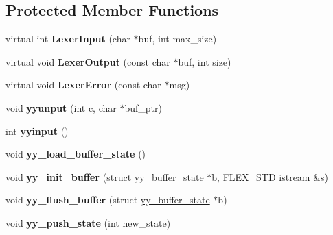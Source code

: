 \subsection*{Protected Member Functions}
\begin{DoxyCompactItemize}
\item 
virtual int {\bfseries Lexer\+Input} (char $\ast$buf, int max\+\_\+size)\hypertarget{classyyFlexLexer_af9c0885f114ce4f3749e6ad2f388d32c}{}\label{classyyFlexLexer_af9c0885f114ce4f3749e6ad2f388d32c}

\item 
virtual void {\bfseries Lexer\+Output} (const char $\ast$buf, int size)\hypertarget{classyyFlexLexer_ae395429e59be89963e517411ec09c6ca}{}\label{classyyFlexLexer_ae395429e59be89963e517411ec09c6ca}

\item 
virtual void {\bfseries Lexer\+Error} (const char $\ast$msg)\hypertarget{classyyFlexLexer_aace65d0bcf43507968bb9212a9dceb59}{}\label{classyyFlexLexer_aace65d0bcf43507968bb9212a9dceb59}

\item 
void {\bfseries yyunput} (int c, char $\ast$buf\+\_\+ptr)\hypertarget{classyyFlexLexer_a54064ce670d0caa1a45c5656d5e11538}{}\label{classyyFlexLexer_a54064ce670d0caa1a45c5656d5e11538}

\item 
int {\bfseries yyinput} ()\hypertarget{classyyFlexLexer_a4560699d55cb842ea01ca38e595afd95}{}\label{classyyFlexLexer_a4560699d55cb842ea01ca38e595afd95}

\item 
void {\bfseries yy\+\_\+load\+\_\+buffer\+\_\+state} ()\hypertarget{classyyFlexLexer_acc37b2da3bc88ae411e2009c8a534ee3}{}\label{classyyFlexLexer_acc37b2da3bc88ae411e2009c8a534ee3}

\item 
void {\bfseries yy\+\_\+init\+\_\+buffer} (struct \hyperlink{structyy__buffer__state}{yy\+\_\+buffer\+\_\+state} $\ast$b, F\+L\+E\+X\+\_\+\+S\+TD istream \&s)\hypertarget{classyyFlexLexer_a97f6d4ca99a4eef02b55e5b6a44e811a}{}\label{classyyFlexLexer_a97f6d4ca99a4eef02b55e5b6a44e811a}

\item 
void {\bfseries yy\+\_\+flush\+\_\+buffer} (struct \hyperlink{structyy__buffer__state}{yy\+\_\+buffer\+\_\+state} $\ast$b)\hypertarget{classyyFlexLexer_ae2c2e8f3beb40d55311864d867493d68}{}\label{classyyFlexLexer_ae2c2e8f3beb40d55311864d867493d68}

\item 
void {\bfseries yy\+\_\+push\+\_\+state} (int new\+\_\+state)\hypertarget{classyyFlexLexer_a6246bcfbf2bed9f3497d4f6398e11706}{}\label{classyyFlexLexer_a6246bcfbf2bed9f3497d4f6398e11706}


\end{DoxyCompactItemize}
